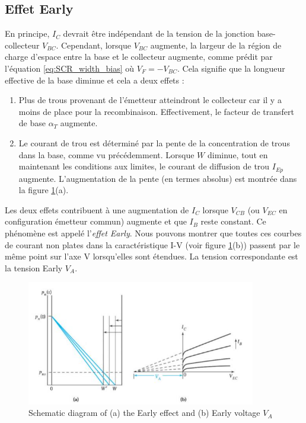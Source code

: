 \subsection{Effet Early}
En principe, $I_C$ devrait être indépendant de la tension de la jonction base-collecteur $V_{BC}$. Cependant, lorsque $V_{BC}$ augmente, la largeur de la région de charge d'espace entre la base et le collecteur augmente, comme prédit par l'équation \ref{eq:SCR_width_bias} où $V_F = -V_{BC}$. Cela signifie que la longueur effective de la base diminue et cela a deux effets :
\begin{enumerate}
	\item Plus de trous provenant de l'émetteur atteindront le collecteur car il y a moins de place pour la recombinaison. Effectivement, le facteur de transfert de base $\alpha_T$ augmente.
	\item Le courant de trou est déterminé par la pente de la concentration de trous dans la base, comme vu précédemment. Lorsque $W$ diminue, tout en maintenant les conditions aux limites, le courant de diffusion de trou $I_{Ep}$ augmente. L'augmentation de la pente (en termes absolus) est montrée dans la figure \ref{fig:bjt7}(a).
\end{enumerate}

Les deux effets contribuent à une augmentation de $I_C$ lorsque $V_{CB}$ (ou $V_{EC}$ en configuration émetteur commun) augmente et que $I_B$ reste constant. Ce phénomène est appelé l'\emph{effet Early}. Nous pouvons montrer que toutes ces courbes de courant non plates dans la caractéristique I-V (voir figure \ref{fig:bjt7}(b)) passent par le même point sur l'axe V lorsqu'elles sont étendues. La tension correspondante est la tension Early $V_A$.

\begin{figure}[h!]
\centering
\includegraphics[width=10cm]{figures/ch01/bjt7.jpg}
\caption{Schematic diagram of (a) the Early effect and (b) Early voltage $V_A$} 
\label{fig:bjt7}
\end{figure}

